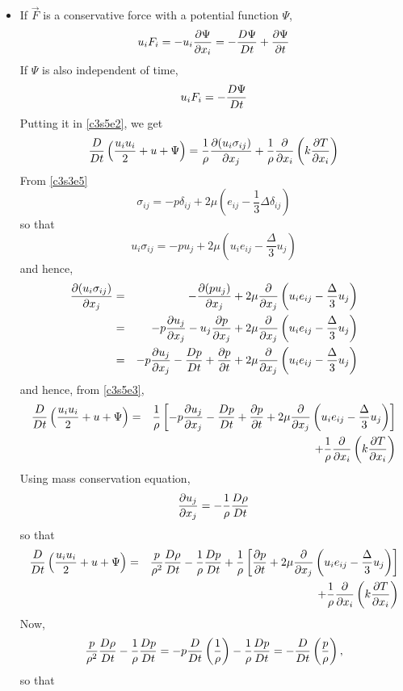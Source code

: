 \begin{itemize}
\item If $\vec{F}$ is a conservative force with a potential function $\Psi$,
\[
u_iF_i = -u_i\frac{\partial{\Psi}}{\partial{x_i}} = -\frac{D{\Psi}}{Dt} + \frac{\partial{\Psi}}{\partial{t}}
\]
If $\Psi$ is also independent of time, 
\[
u_iF_i = -\frac{D{\Psi}}{Dt}
\]
Putting it in \eqref{c3s5e2}, we get
\begin{equation}\label{c3s5e3}
\frac{D}{Dt}\left(\frac{u_iu_i}{2} + u + \Psi\right) = \frac{1}{\rho}\frac{\partial{(u_i\sigma_{ij})}}{\partial{x_j}} + \frac{1}{\rho}\frac{\partial}{\partial x_i}\left(k\frac{\partial{T}}{\partial{x_i}}\right)
\end{equation}
From \eqref{c3s3e5}
\[
\sigma_{ij} = -p\delta_{ij} + 2\mu\left(e_{ij} -\frac{1}{3}\Delta\delta_{ij}\right)
\]
so that
\[
u_i\sigma_{ij} = -pu_j + 2\mu\left(u_ie_{ij} -\frac{\Delta}{3} u_j\right)
\]
and hence,
\begin{eqnarray*}
\frac{\partial{(u_i\sigma_{ij})}}{\partial{x_j}} &=& -\frac{\partial{(pu_j)}}{\partial{x_j}} + 2\mu\frac{\partial}{\partial x_j}\left(u_ie_{ij} -\frac{\Delta}{3} u_j\right) \\
 &=& -p\frac{\partial{u_j}}{\partial{x_j}} - u_j\frac{\partial{p}}{\partial{x_j}} + 2\mu\frac{\partial}{\partial x_j}\left(u_ie_{ij} -\frac{\Delta}{3} u_j\right) \\
 &=& -p\frac{\partial{u_j}}{\partial{x_j}} - \frac{D{p}}{Dt} + \frac{\partial{p}}{\partial{t}} + 2\mu\frac{\partial}{\partial x_j}\left(u_ie_{ij} -\frac{\Delta}{3} u_j\right)
\end{eqnarray*}
and hence, from \eqref{c3s5e3},
\begin{eqnarray*}
\frac{D}{Dt}\left(\frac{u_iu_i}{2} + u + \Psi\right) &=& 
\frac{1}{\rho}\left[-p\frac{\partial{u_j}}{\partial{x_j}} - \frac{D{p}}{Dt} + \frac{\partial{p}}{\partial{t}} + 2\mu\frac{\partial}{\partial x_j}\left(u_ie_{ij} -\frac{\Delta}{3} u_j\right)\right]\\
 & & + \frac{1}{\rho}\frac{\partial}{\partial x_i}\left(k\frac{\partial{T}}{\partial{x_i}}\right)
\end{eqnarray*}
Using mass conservation equation,
\[
\frac{\partial{u_j}}{\partial{x_j}} = -\frac{1}{\rho}\frac{D{\rho}}{Dt}
\]
so that
\begin{eqnarray*}
\frac{D}{Dt}\left(\frac{u_iu_i}{2} + u + \Psi\right) &=& 
\frac{p}{\rho^2}\frac{D{\rho}}{Dt} - \frac{1}{\rho}\frac{D{p}}{Dt} + \frac{1}{\rho}\left[\frac{\partial{p}}{\partial{t}} + 2\mu\frac{\partial}{\partial x_j}\left(u_ie_{ij} -\frac{\Delta}{3} u_j\right)\right] \\
 & & + \frac{1}{\rho}\frac{\partial}{\partial x_i}\left(k\frac{\partial{T}}{\partial{x_i}}\right)
\end{eqnarray*}
Now,
\[
\frac{p}{\rho^2}\frac{D{\rho}}{Dt} - \frac{1}{\rho}\frac{D{p}}{Dt} = -p\frac{D}{Dt}\left(\frac{1}{\rho}\right) - \frac{1}{\rho}\frac{D{p}}{Dt} = -\frac{D}{Dt}\left(\frac{p}{\rho}\right),
\]
so that
\begin{eqnarray*}

\end{eqnarray*}
\end{itemize}
